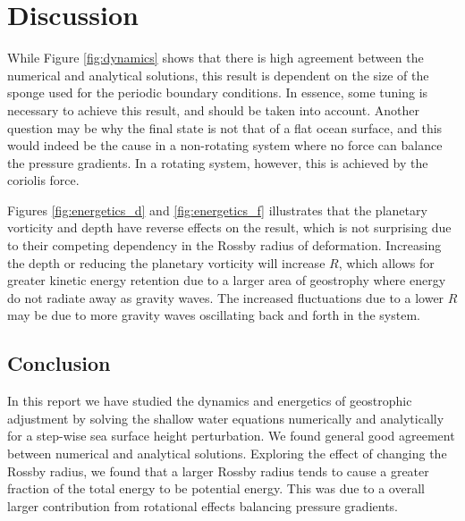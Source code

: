 \section{Discussion}
\label{sec:conclusion}

While Figure \ref{fig:dynamics} shows that there is high agreement between the numerical and analytical solutions, this result is dependent on the size of the sponge used for the periodic boundary conditions. In essence, some tuning is necessary to achieve this result, and should be taken into account. Another question may be why the final state is not that of a flat ocean surface, and this would indeed be the cause in a non-rotating system where no force can balance the pressure gradients. In a rotating system, however, this is achieved by the coriolis force.

Figures \ref{fig:energetics_d} and \ref{fig:energetics_f} illustrates that the planetary vorticity and depth have reverse effects on the result, which is not surprising due to their competing dependency in the Rossby radius of deformation. Increasing the depth or reducing the planetary vorticity will increase $R$, which allows for greater kinetic energy retention due to a larger area of geostrophy where energy do not radiate away as gravity waves. The increased fluctuations due to a lower $R$ may be due to more gravity waves oscillating back and forth in the system.

\subsection{Conclusion}
In this report we have studied the dynamics and energetics of geostrophic adjustment by solving the shallow water equations numerically and analytically for a step-wise sea surface height perturbation. We found general good agreement between numerical and analytical solutions. Exploring the effect of changing the Rossby radius, we found that a larger Rossby radius tends to cause a greater fraction of the total energy to be potential energy. This was due to a overall larger contribution from rotational effects balancing pressure gradients.